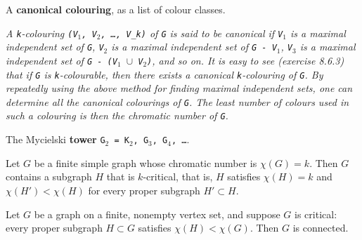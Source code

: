 \begin{definition}
\label{SimpleGraph.IsCanonicalColouring}
\leanok
{}
A \textbf{canonical colouring}, as a list of colour classes.

\emph{A \texttt{k}-colouring \texttt{(V$_{1}$, V$_{2}$, \dots{}, V\_k)} of
\texttt{G} is said to be canonical if \texttt{V$_{1}$} is a maximal independent set of \texttt{G}, \texttt{V$_{2}$} is a
maximal independent set of \texttt{G - V$_{1}$}, \texttt{V$_{3}$} is a maximal
independent set of
\texttt{G - (V$_{1}$ $\cup$ V$_{2}$)}, and so on.  It is easy to see (exercise 8.6.3) that if \texttt{G} is
\texttt{k}-colourable, then there exists a canonical \texttt{k}-colouring of \texttt{G}.  By repeatedly
using the above method for finding maximal independent sets, one can determine all
the canonical colourings of \texttt{G}.  The least number of colours used in such a
colouring is then the chromatic number of \texttt{G}.}
\end{definition}

\begin{definition}[The Mycielski tower $G_{2} = K_{2}, G_{3}, G_{4}, \dots$]
\label{SimpleGraph.mycielskiTower}
\leanok
{}
The Mycielski \textbf{tower} \texttt{G$_{2}$ = K$_{2}$, G$_{3}$, G$_{4}$, \dots{}}.
\end{definition}

\begin{theorem}
\label{SimpleGraph.exists_isKCritical_subgraph}
\leanok
{}
Let $G$ be a finite simple graph whose chromatic number is $\chi(G) = k$. Then $G$
contains a subgraph $H$ that is $k$-critical, that is, $H$ satisfies $\chi(H) = k$ and
$\chi(H') < \chi(H)$ for every proper subgraph $H' \subset H$.
\end{theorem}

\begin{theorem}
\label{SimpleGraph.IsCritical.connected}
\leanok
{}
Let $G$ be a graph on a finite, nonempty vertex set, and suppose $G$ is critical: every
proper subgraph $H \subset G$ satisfies $\chi(H) < \chi(G)$. Then $G$ is connected.
\end{theorem}


